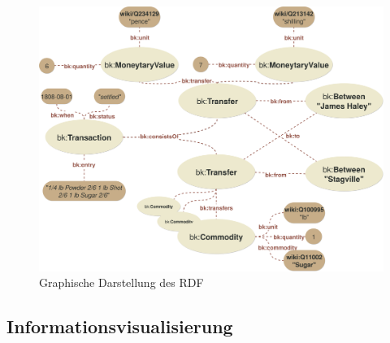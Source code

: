 \documentclass[12pt,a4paper]{article}
\begin{document}
\begin{figure}[H]
\centering
	\includegraphics[width=1\textwidth]{img/example.png}  
    \caption[Graphische Darstellung des RDF, eigene Darstellung, 01.06.2019.]{Graphische Darstellung des RDF} \label{fig:example}
\end{figure}


\newpage
\subsection{Informationsvisualisierung}
\end{document}
